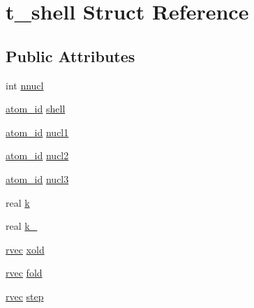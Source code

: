 \hypertarget{structt__shell}{\section{t\-\_\-shell \-Struct \-Reference}
\label{structt__shell}
}
\subsection*{\-Public \-Attributes}
\begin{DoxyCompactItemize}
\item 
int \hyperlink{structt__shell_acc68149d18898e99ea5565763839b471}{nnucl}
\item 
\hyperlink{include_2types_2simple_8h_ad3f47cdb48677e516e2049719612c737}{atom\-\_\-id} \hyperlink{structt__shell_a4c296b695ffca1aa1e4826807c6b279b}{shell}
\item 
\hyperlink{include_2types_2simple_8h_ad3f47cdb48677e516e2049719612c737}{atom\-\_\-id} \hyperlink{structt__shell_ac796693219c4cea681c9cb86b223b387}{nucl1}
\item 
\hyperlink{include_2types_2simple_8h_ad3f47cdb48677e516e2049719612c737}{atom\-\_\-id} \hyperlink{structt__shell_a1222ad3f1e740d5e88c5b48b1b48ef0c}{nucl2}
\item 
\hyperlink{include_2types_2simple_8h_ad3f47cdb48677e516e2049719612c737}{atom\-\_\-id} \hyperlink{structt__shell_ad5f17b5b0c2fc6aa0dadb5fe44f78cf2}{nucl3}
\item 
real \hyperlink{structt__shell_a3d62b51f5083590fb29cba401af6e051}{k}
\item 
real \hyperlink{structt__shell_a0684ff3cff2bb4d1a94c3bba915f0bc5}{k\-\_}
\item 
\hyperlink{share_2template_2gromacs_2types_2simple_8h_aa02a552a4abd2f180c282a083dc3a999}{rvec} \hyperlink{structt__shell_ae83b9774064ec104e760a99c88194efb}{xold}
\item 
\hyperlink{share_2template_2gromacs_2types_2simple_8h_aa02a552a4abd2f180c282a083dc3a999}{rvec} \hyperlink{structt__shell_a8506f8407c00bd1f4c3c6867ee619d93}{fold}
\item 
\hyperlink{share_2template_2gromacs_2types_2simple_8h_aa02a552a4abd2f180c282a083dc3a999}{rvec} \hyperlink{structt__shell_a0d9ed1e4ad2230952e57174f36fcc12d}{step}
\end{DoxyCompactItemize}


